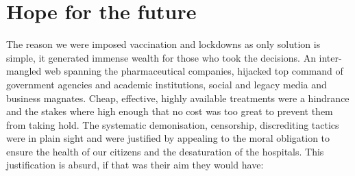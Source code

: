 \documentclass[11pt,a4paper,notitlepage]{report}
\begin{document}
\section*{Hope for the future}

The reason we were imposed vaccination and lockdowns as only solution is simple, it generated immense wealth for those who took the decisions. An inter-mangled web spanning the pharmaceutical companies, hijacked top command of government agencies and academic institutions, social and legacy media and business magnates. Cheap, effective, highly available treatments were a hindrance and the stakes where high enough that no cost was too great to prevent them from taking hold. The systematic demonisation, censorship, discrediting tactics were in plain sight and were justified by appealing to the moral obligation to ensure the health of our citizens and the desaturation of the hospitals. This justification is absurd, if that was their aim they would have:
\end{document}
